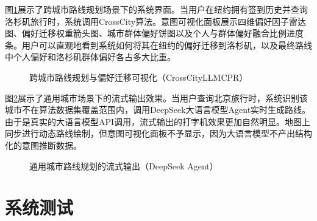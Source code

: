 图\ref{fig:ch5_impl_cross}展示了跨城市路线规划场景下的系统界面。当用户在纽约拥有签到历史并查询洛杉矶旅行时，系统调用CrossCity算法。意图可视化面板展示四维偏好因子雷达图、偏好迁移权重箭头图、城市群体偏好饼图以及个人与群体偏好融合比例进度条。用户可以直观地看到系统如何将其在纽约的偏好迁移到洛杉矶，以及最终路线中个人偏好和洛杉矶群体偏好各占多大比重。

\begin{figure}[hbt]
  \centering
  \caption{跨城市路线规划与偏好迁移可视化（CrossCityLLMCPR）}
  \label{fig:ch5_impl_cross}
\end{figure}

图\ref{fig:ch5_impl_llm}展示了通用城市场景下的流式输出效果。当用户查询北京旅行时，系统识别该城市不在算法数据集覆盖范围内，调用DeepSeek大语言模型Agent实时生成路线。由于是真实的大语言模型API调用，流式输出的打字机效果更加自然明显。地图上同步进行动态路线绘制，但意图可视化面板不予显示，因为大语言模型不产出结构化的意图推断数据。

\begin{figure}[hbt]
  \centering
  \caption{通用城市路线规划的流式输出（DeepSeek Agent）}
  \label{fig:ch5_impl_llm}
\end{figure}

%

\section{系统测试}
\label{sec:ch5_testing}


